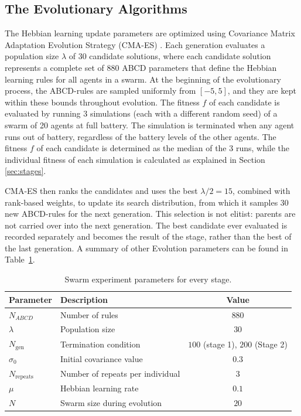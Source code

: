 \documentclass[runningheads]{llncs}
\begin{document}
\subsection{The Evolutionary Algorithms}
The Hebbian learning update parameters are optimized using Covariance Matrix Adaptation Evolution Strategy (CMA-ES) \cite{Hansen2001}. Each generation evaluates a population size $\lambda$ of 30 candidate solutions, where each candidate solution represents a complete set of 880 ABCD parameters that define the Hebbian learning rules for all agents in a swarm. At the beginning of the evolutionary process, the ABCD-rules are sampled uniformly from $[-5, 5]$, and they are kept within these bounds throughout evolution. The fitness $f$ of each candidate is evaluated by running 3 simulations (each with a different random seed) of a swarm of 20 agents at full battery. The simulation is terminated when any agent runs out of battery, regardless of the battery levels of the other agents. The fitness $f$ of each candidate is determined as the median of the 3 runs, while the individual fitness of each simulation is calculated as explained in Section \ref{sec:stages}.

CMA-ES then ranks the candidates and uses the best $\lambda/2 = 15$, combined with rank-based weights, to update its search distribution, from which it samples 30 new ABCD-rules for the next generation. This selection is not elitist: parents are not carried over into the next generation. The best candidate ever evaluated is recorded separately and becomes the result of the stage, rather than the best of the last generation.
A summary of other Evolution parameters can be found in Table~\ref{tab:swarm_experiment}.

\begin{table}[t]
    \centering
    \caption{Swarm experiment parameters for every stage.}
    \begin{tabular}{llc}
    \toprule
         \textbf{Parameter} & \textbf{Description} & \textbf{Value}\\
        \midrule
        $N_{ABCD}$ &   Number of rules & $880$\\
        $\lambda$  & Population size &  $30$\\
        $N_{\text{gen}}$  & Termination condition & $100$ (stage 1), $200$ (Stage 2)\\
        $\sigma_0$  & Initial covariance value & $0.3$\\
        $N_{\text{repeats}}$  & Number of repeats per individual & $3$\\
        $\mu$  & Hebbian learning rate & $0.1$\\
        $N$  & Swarm size during evolution & $20$\\
        \bottomrule
    \end{tabular}
    \label{tab:swarm_experiment}
\end{table}
\end{document}
